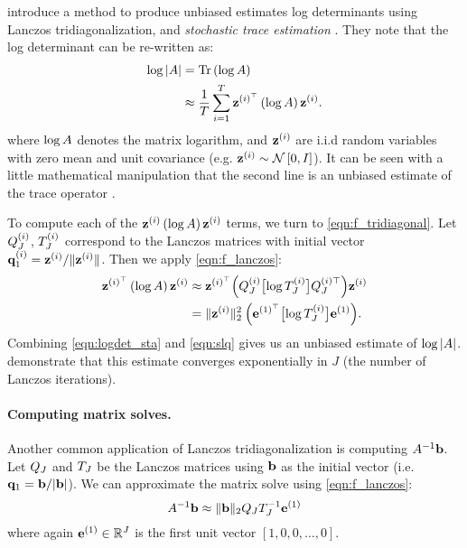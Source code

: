 \citet{ubaru2017fast} introduce a method to produce unbiased estimates log determinants using Lanczos tridiagonalization, and \emph{stochastic trace estimation} \cite{hutchinson1990stochastic,avron2011randomized,fitzsimons2016improved}.
They note that the log determinant can be re-written as:
%
\begin{align}
  \log \vert \bA \vert &= \tr{ \log \bA }
  \nonumber \\
  &\approx \frac{1}{T} \sum_{i=1}^T \bz^{(i)^\top} \left( \log \bA \right) \bz^{(i)}.
  \label{eqn:logdet_sta}
\end{align}
%
where $\log A$ denotes the matrix logarithm, and $\mathbf{z}^{(i)}$ are i.i.d random variables with zero mean and unit covariance (e.g. $\mathbf{z}^{(i)} \sim \mathcal{N} \left[ 0, I \right]$).
It can be seen with a little mathematical manipulation that the second line is an unbiased estimate of the trace operator \cite{hutchinson1990stochastic}.

To compute each of the $\mathbf{z}^{(i)} \left( \log A \right) \mathbf{z}^{(i)}$ terms, we turn to \cref{eqn:f_tridiagonal}.
Let $Q_J^{(i)}$, $T_J^{(i)}$ correspond to the Lanczos matrices with initial vector $\mathbf{q}^{(i)}_1 = \mathbf{z}^{(i)} / \Vert \mathbf{z}^{(i)} \Vert$.
Then we apply \cref{eqn:f_lanczos}:
%
\begin{align}
  \mathbf{z}^{(i)^\top} \left( \log A \right) \mathbf{z}^{(i)}
  &\approx \mathbf{z}^{(i)^\top} \Bigl( Q^{(i)}_J \bigl[ \log T^{(i)}_J \bigr] Q^{(i)\top}_J \Bigr) \mathbf{z}^{(i)}
  \nonumber
  \\
  &= \Vert \mathbf{z}^{(i)} \Vert^2_2 \: \Bigl( \mathbf{e}^{(1)^\top} \bigl[ \log T^{(i)}_J \bigr] \mathbf{e}^{(1)} \Bigr).
  \label{eqn:slq}
\end{align}
%
Combining \cref{eqn:logdet_sta} and \cref{eqn:slq} gives us an unbiased estimate of $\log \vert A \vert$.
\citet{ubaru2017fast} demonstrate that this estimate converges exponentially in $J$ (the number of Lanczos iterations).

\paragraph{Computing matrix solves.}
Another common application of Lanczos tridiagonalization is computing $A^{-1} \mathbf{b}$.
Let $Q_J$ and $T_J$ be the Lanczos matrices using $\mathbf{b}$ as the initial vector (i.e. $\mathbf{q}_1 = \mathbf{b} / \vert \mathbf{b} \vert$).
We can approximate the matrix solve using \cref{eqn:f_lanczos}:
%
\begin{equation}
  A^{-1} \mathbf{b} \approx \Vert \mathbf{b} \Vert_2 Q_J T_J^{-1} \mathbf{e}^{(1)}
  \label{eqn:lanczos_solves}
\end{equation}
%
where again $\mathbf{e}^{(1)} \in \mathbb{R}^J$ is the first unit vector $[1, 0, 0, \ldots, 0]$.




